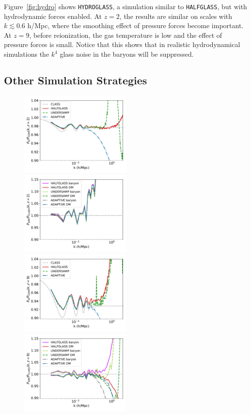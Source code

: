 \documentclass[a4paper,11pt]{article}
\begin{document}
Figure~\ref{fig:hydro} shows \texttt{HYDROGLASS}, a simulation similar to \texttt{HALFGLASS}, but with hydrodynamic forces enabled. At $z=2$, the results are similar on scales with $k \lesssim 0.6$ h/Mpc, where the smoothing effect of pressure forces become important. At $z=9$, before reionization, the gas temperature is low and the effect of pressure forces is small. Notice that this shows that in realistic hydrodynamical simulations the $k^4$ glass noise in the baryons will be suppressed.

\subsection{Other Simulation Strategies}
\label{sec:otherstrat}

\begin{figure}
\includegraphics[width=0.5\textwidth]{plots/oversample_2_relpower.pdf}
  \includegraphics[width=0.5\textwidth]{plots/oversample_2_class.pdf} \\
  \includegraphics[width=0.5\textwidth]{plots/oversample_9_relpower.pdf}
  \includegraphics[width=0.5\textwidth]{plots/oversample_9_class.pdf}


\end{figure}
\end{document}
